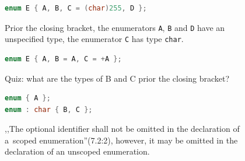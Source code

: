 \documentclass{fithesis3}
\begin{document}
\begin{figure}
\begin{lstlisting}[language=C++]
enum E { A, B, C = (char)255, D };
\end{lstlisting}
\caption{Prior the closing bracket, the enumerators \texttt{A}, \texttt{B} and \texttt{D} have an unspecified type, the enumerator \texttt{C} has type \texttt{char}.}
\end{figure}

\begin{figure}
\begin{lstlisting}[language=C++]
enum E { A, B = A, C = +A };
\end{lstlisting}
\caption{Quiz: what are the types of B and C prior the closing bracket?}
\end{figure}

\begin{figure}
\begin{lstlisting}[language=C++]
enum { A };
enum : char { B, C };
\end{lstlisting}
\caption{,,The optional identifier shall not be omitted in the declaration of a~scoped enumeration''(7.2:2), however, it may be omitted in the declaration of an unscoped enumeration.}
\end{figure}











\end{document}
